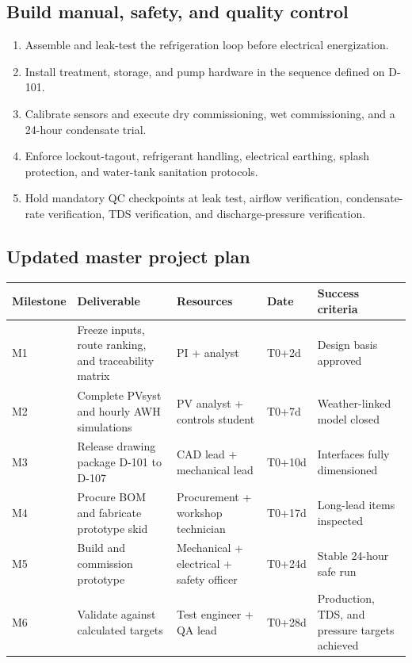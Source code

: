 \documentclass[11pt,a4paper]{article}
\begin{document}
\subsection{Build manual, safety, and quality control}
\begin{enumerate}[leftmargin=*]
  \item Assemble and leak-test the refrigeration loop before electrical energization.
  \item Install treatment, storage, and pump hardware in the sequence defined on D-101.
  \item Calibrate sensors and execute dry commissioning, wet commissioning, and a 24-hour condensate trial.
  \item Enforce lockout-tagout, refrigerant handling, electrical earthing, splash protection, and water-tank sanitation protocols.
  \item Hold mandatory QC checkpoints at leak test, airflow verification, condensate-rate verification, TDS verification, and discharge-pressure verification.
\end{enumerate}

\subsection{Updated master project plan}
\begin{table}[h]
\centering
\small
\begin{tabular}{@{}p{2.0cm}p{4.2cm}p{3.1cm}p{2.0cm}p{3.4cm}@{}}
\toprule
\textbf{Milestone} & \textbf{Deliverable} & \textbf{Resources} & \textbf{Date} & \textbf{Success criteria} \\
\midrule
M1 & Freeze inputs, route ranking, and traceability matrix & PI + analyst & T0+2d & Design basis approved \\
M2 & Complete PVsyst and hourly AWH simulations & PV analyst + controls student & T0+7d & Weather-linked model closed \\
M3 & Release drawing package D-101 to D-107 & CAD lead + mechanical lead & T0+10d & Interfaces fully dimensioned \\
M4 & Procure BOM and fabricate prototype skid & Procurement + workshop technician & T0+17d & Long-lead items inspected \\
M5 & Build and commission prototype & Mechanical + electrical + safety officer & T0+24d & Stable 24-hour safe run \\
M6 & Validate against calculated targets & Test engineer + QA lead & T0+28d & Production, TDS, and pressure targets achieved \\
\bottomrule
\end{tabular}
\end{table}
\end{document}
